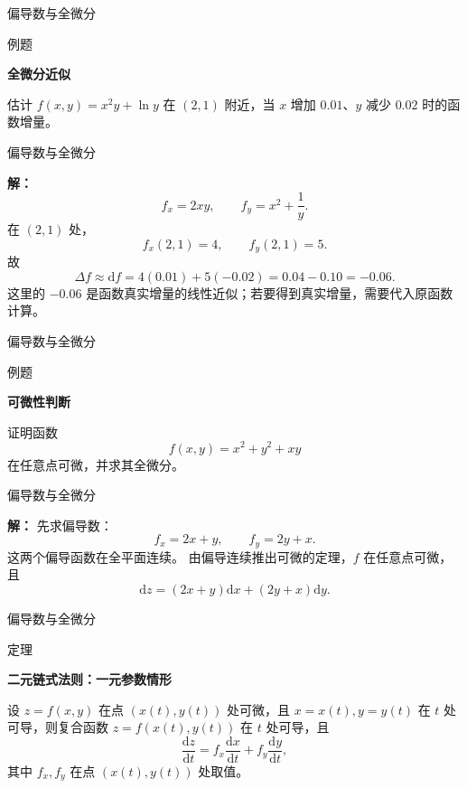 \documentclass[aspectratio=169,10pt,fontset=fandol]{ctexbeamer}
\newcommand{\dd}{\mathrm{d}}
\begin{document}
\begin{frame}[t,fragile]{偏导数与全微分}
\footnotesize
\begin{block}{例题}
{\footnotesize
\textbf{全微分近似}\par

估计 $f(x,y)=x^2y+\ln y$ 在 $(2,1)$ 附近，当 $x$ 增加 $0.01$、$y$ 减少 $0.02$ 时的函数增量。

}
\end{block}
\end{frame}
\begin{frame}[t,fragile]{偏导数与全微分}
\footnotesize
{\footnotesize
\textbf{解：}
\[
f_x=2xy,\qquad f_y=x^2+\frac1y.
\]
在 $(2,1)$ 处，
\[
f_x(2,1)=4,\qquad f_y(2,1)=5.
\]
故
\[
\Delta f\approx \dd f=4(0.01)+5(-0.02)=0.04-0.10=-0.06.
\]
这里的 $-0.06$ 是函数真实增量的线性近似；若要得到真实增量，需要代入原函数计算。

}
\end{frame}
\begin{frame}[t,fragile]{偏导数与全微分}
\footnotesize
\begin{block}{例题}
{\footnotesize
\textbf{可微性判断}\par

证明函数
\[
f(x,y)=x^2+y^2+xy
\]
在任意点可微，并求其全微分。

}
\end{block}
\end{frame}
\begin{frame}[t,fragile]{偏导数与全微分}
\footnotesize
{\footnotesize
\textbf{解：}
先求偏导数：
\[
f_x=2x+y,\qquad f_y=2y+x.
\]
这两个偏导函数在全平面连续。 由偏导连续推出可微的定理，$f$ 在任意点可微，且
\[
\dd z=(2x+y)\dd x+(2y+x)\dd y.
\]

}
\end{frame}
\begin{frame}[t,fragile]{偏导数与全微分}
\footnotesize
\begin{block}{定理}
{\footnotesize
\textbf{二元链式法则：一元参数情形}\par

设 $z=f(x,y)$ 在点 $(x(t),y(t))$ 处可微，且 $x=x(t),y=y(t)$ 在 $t$ 处可导，则复合函数 $z=f(x(t),y(t))$ 在 $t$ 处可导，且
\[
\frac{\dd z}{\dd t}=f_x\frac{\dd x}{\dd t}+f_y\frac{\dd y}{\dd t},
\]
其中 $f_x,f_y$ 在点 $(x(t),y(t))$ 处取值。

}
\end{block}
\end{frame}
\end{document}
